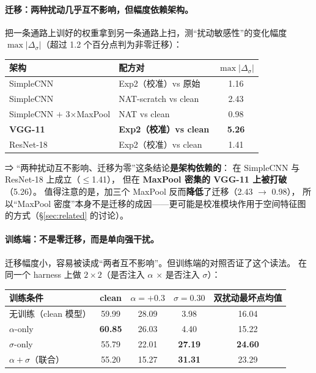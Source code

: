 \documentclass[11pt,a4paper]{ctexart}
\begin{document}
\paragraph{迁移：两种扰动几乎互不影响，但幅度依赖架构。}
把一条通路上训好的权重拿到另一条通路上扫，测“扰动敏感性”的变化幅度
$\max|\Delta_\sigma|$（超过 1.2 个百分点判为非零迁移）：

\begin{center}
\small
\begin{tabular}{llc}
\toprule
架构 & 配方对 & $\max|\Delta_\sigma|$ \\
\midrule
SimpleCNN & Exp2（校准）vs 原始 & 1.16 \\
SimpleCNN & NAT-scratch vs clean & 2.43 \\
SimpleCNN $+$ 3$\times$MaxPool & NAT vs clean & 0.98 \\
\textbf{VGG-11} & \textbf{Exp2（校准）vs clean} & \textbf{5.26} \\
ResNet-18 & Exp2（校准）vs clean & 1.41 \\
\bottomrule
\end{tabular}
\end{center}

⇒ “两种扰动互不影响、迁移为零”这条结论\textbf{是架构依赖的}：
在 SimpleCNN 与 ResNet-18 上成立（$\le$1.41），
但在 \textbf{MaxPool 密集的 VGG-11 上被打破}（5.26）。
值得注意的是，加三个 MaxPool 反而\textbf{降低}了迁移（2.43 $\to$ 0.98），
所以“MaxPool 密度”本身不是迁移的成因——更可能是校准模块作用于空间特征图的方式（\S\ref{sec:related} 的讨论）。

\paragraph{训练端：不是零迁移，而是单向强干扰。}
迁移幅度小，容易被读成“两者互不影响”。但训练端的对照否证了这个读法。
在同一个 harness 上做 $2\times2$（是否注入 $\alpha$ $\times$ 是否注入 $\sigma$）：

\begin{center}
\small
\begin{tabular}{lcccc}
\toprule
训练条件 & clean & $\alpha=+0.3$ & $\sigma=0.30$ & 双扰动最坏点均值 \\
\midrule
无训练（clean 模型） & 59.99 & 28.09 & 3.98 & 16.04 \\
$\alpha$-only & \textbf{60.85} & 26.03 & 4.40 & 15.22 \\
$\sigma$-only & 55.79 & 22.01 & \textbf{27.19} & \textbf{24.60} \\
$\alpha+\sigma$（联合） & 55.20 & 15.27 & \textbf{31.31} & 23.29 \\
\bottomrule
\end{tabular}
\end{center}
\end{document}

